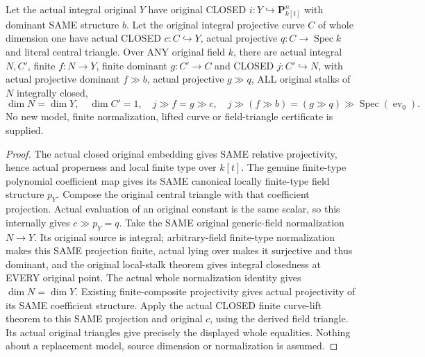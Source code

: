 \begin{lemma}
\label{lem:pl-gauss-original-normalized-model-closed-central-curve}
\leanok
Let the actual integral original $Y$ have original CLOSED
$i:Y\hookrightarrow\mathbf P^n_{k[t]}$ with dominant SAME structure
$b$. Let the original integral projective curve $C$ of whole dimension
one have actual CLOSED $c:C\hookrightarrow Y$, actual projective
$q:C\to\operatorname{Spec}k$ and literal central triangle. Over ANY
original field $k$, there are actual integral $N,C'$, finite
$f:N\to Y$, finite dominant $g:C'\to C$ and CLOSED
$j:C'\hookrightarrow N$, with actual projective dominant $f\gg b$,
actual projective $g\gg q$, ALL original stalks of $N$ integrally closed,
\[
 \dim N=\dim Y,\quad\dim C'=1,\quad
 j\gg f=g\gg c,\quad
 j\gg(f\gg b)=(g\gg q)\gg\operatorname{Spec}(\operatorname{ev}_0).
\]
No new model, finite normalization, lifted curve or field-triangle
certificate is supplied.
\end{lemma}
\begin{proof}
The actual closed original embedding gives SAME relative projectivity,
hence actual properness and local finite type over $k[t]$. The genuine
finite-type polynomial coefficient map gives its SAME canonical locally
finite-type field structure $p_Y$. Compose the original central triangle
with that coefficient projection. Actual evaluation of an original
constant is the same scalar, so this internally gives $c\gg p_Y=q$.
Take the SAME original generic-field normalization $N\to Y$. Its
original source is integral; arbitrary-field finite-type normalization
makes this SAME projection finite, actual lying over makes it surjective
and thus dominant, and the original local-stalk theorem gives integral
closedness at EVERY original point. The actual whole normalization
identity gives $\dim N=\dim Y$. Existing finite-composite projectivity
gives actual projectivity of its SAME coefficient structure. Apply the
actual CLOSED finite curve-lift theorem to this SAME projection and
original $c$, using the derived field triangle. Its actual original
triangles give precisely the displayed whole equalities. Nothing about
a replacement model, source dimension or normalization is assumed.
\end{proof}

